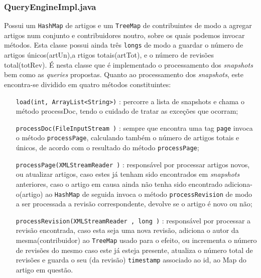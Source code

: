 \documentclass[a4paper,11pt]{article}
\begin{document}
\subsubsection{QueryEngineImpl.java}
Possui um \texttt{HashMap} de artigos e um \texttt{TreeMap} de contribuintes de modo a agregar artigos num conjunto e contribuidores noutro, sobre os quais podemos invocar métodos. Esta classe possui ainda três \texttt{longs} de modo a guardar o número de artigos únicos(artUn),a rtigos totais(artTot), e o número de revisões total(totRev). É nesta classe que é implementado o processamento dos \textit{snapshots} bem como as \textit{queries} propostas. Quanto ao processamento dos \textit{snapshots}, este encontra-se dividido em quatro métodos constituintes:
\begin{itemize}[align=left]
\item[\texttt{load(int, ArrayList<String>)}] : percorre a lista de snapshots e chama o método processDoc, tendo o cuidado de tratar as exceções que ocorram;
\item[\texttt{processDoc(FileInputStream )}] : sempre que encontra uma tag \texttt{page} invoca o método \texttt{processPage}, calculando também o número de artigos totais e únicos, de acordo com o resultado do método \texttt{processPage};
\item[\texttt{processPage(XMLStreamReader )}]: responsável por processar artigos novos, ou atualizar artigos, caso estes já tenham sido encontrados em \textit{snapshots} anteriores, caso o artigo em causa ainda não tenha sido encontrado adiciona-o(artigo) ao \texttt{HashMap} de seguida invoca o método \texttt{processRevision} de modo a ser processada a revisão correspondente, devolve se o artigo é novo ou não;
\item[\texttt{processRevision(XMLStreamReader , long )}]: responsável por processar a revisão encontrada, caso esta seja uma nova revisão, adiciona o autor da mesma(contribuidor) ao \texttt{TreeMap} usado para o efeito, ou incrementa o número de revisões do mesmo caso este já esteja presente, atualiza o número total de revisões e guarda o seu (da revisão) \texttt{timestamp} associado ao id, ao Map do artigo em questão.
\end{itemize}
\end{document}
